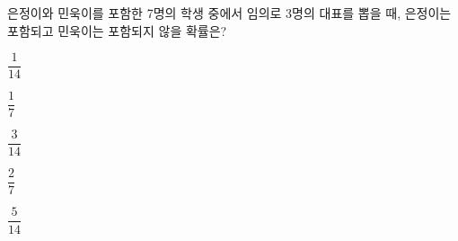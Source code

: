 은정이와 민욱이를 포함한 7명의 학생 중에서 임의로 3명의 대표를 뽑을 때, 은정이는 포함되고 민욱이는 포함되지 않을 확률은?
\begin{choicesii}{\rule[-3ex]{0pt}{8ex}$\dfrac{1}{14}$}{\rule[-3ex]{0pt}{8ex}$\dfrac{1}{7}$}{\rule[-3ex]{0pt}{8ex}$\dfrac{3}{14}$}{\rule[-3ex]{0pt}{8ex}$\dfrac{2}{7}$}{\rule[-3ex]{0pt}{8ex}$\dfrac{5}{14}$}\end{choicesii}
